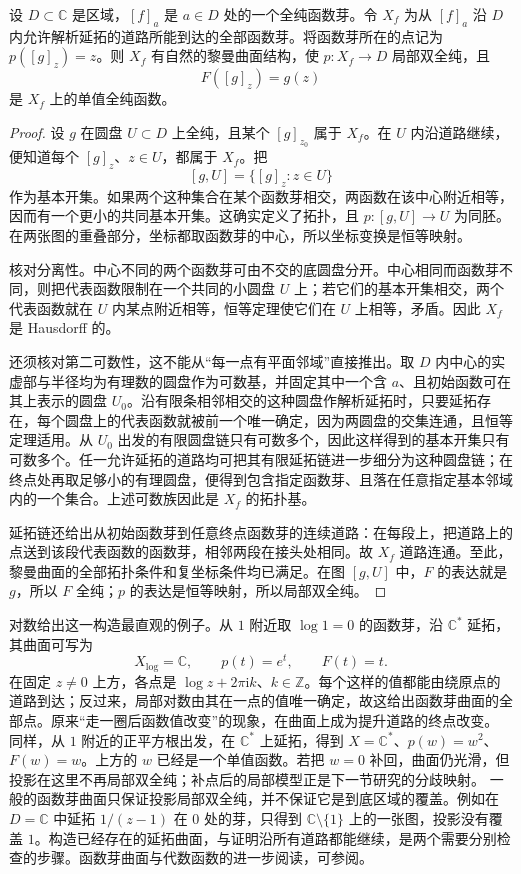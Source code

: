 \begin{theorem}
	\label{g4:thm:0201:continuation-surface}
	设 \(D\subset\mathbb C\) 是区域，\([f]_a\) 是 \(a\in D\) 处的一个全纯函数芽。令 \(X_f\) 为从 \([f]_a\) 沿 \(D\) 内允许解析延拓的道路所能到达的全部函数芽。将函数芽所在的点记为 \(p([g]_z)=z\)。则 \(X_f\) 有自然的黎曼曲面结构，使 \(p:X_f\to D\) 局部双全纯，且
	\[
		F([g]_z)=g(z)
	\]
	是 \(X_f\) 上的单值全纯函数。
\end{theorem}
\begin{proof}
	设 \(g\) 在圆盘 \(U\subset D\) 上全纯，且某个 \([g]_{z_0}\) 属于 \(X_f\)。在 \(U\) 内沿道路继续，便知道每个 \([g]_z\)、\(z\in U\)，都属于 \(X_f\)。把
	\[
		[g,U]=\{[g]_z:z\in U\}
	\]
	作为基本开集。如果两个这种集合在某个函数芽相交，两函数在该中心附近相等，因而有一个更小的共同基本开集。这确实定义了拓扑，且 \(p:[g,U]\to U\) 为同胚。在两张图的重叠部分，坐标都取函数芽的中心，所以坐标变换是恒等映射。

	核对分离性。中心不同的两个函数芽可由不交的底圆盘分开。中心相同而函数芽不同，则把代表函数限制在一个共同的小圆盘 \(U\) 上；若它们的基本开集相交，两个代表函数就在 \(U\) 内某点附近相等，恒等定理使它们在 \(U\) 上相等，矛盾。因此 \(X_f\) 是 Hausdorff 的。

	还须核对第二可数性，这不能从“每一点有平面邻域”直接推出。取 \(D\) 内中心的实虚部与半径均为有理数的圆盘作为可数基，并固定其中一个含 \(a\)、且初始函数可在其上表示的圆盘 \(U_0\)。沿有限条相邻相交的这种圆盘作解析延拓时，只要延拓存在，每个圆盘上的代表函数就被前一个唯一确定，因为两圆盘的交集连通，且恒等定理适用。从 \(U_0\) 出发的有限圆盘链只有可数多个，因此这样得到的基本开集只有可数多个。任一允许延拓的道路均可把其有限延拓链进一步细分为这种圆盘链；在终点处再取足够小的有理圆盘，便得到包含指定函数芽、且落在任意指定基本邻域内的一个集合。上述可数族因此是 \(X_f\) 的拓扑基。

	延拓链还给出从初始函数芽到任意终点函数芽的连续道路：在每段上，把道路上的点送到该段代表函数的函数芽，相邻两段在接头处相同。故 \(X_f\) 道路连通。至此，黎曼曲面的全部拓扑条件和复坐标条件均已满足。在图 \([g,U]\) 中，\(F\) 的表达就是 \(g\)，所以 \(F\) 全纯；\(p\) 的表达是恒等映射，所以局部双全纯。
\end{proof}

对数给出这一构造最直观的例子。从 \(1\) 附近取 \(\log1=0\) 的函数芽，沿 \(\mathbb C^*\) 延拓，其曲面可写为
\[
	X_{\log}=\mathbb C,\qquad p(t)=e^t,\qquad F(t)=t.
\]
在固定 \(z\ne0\) 上方，各点是 \(\log z+2\pi\mathrm{i}k\)、\(k\in\mathbb Z\)。每个这样的值都能由绕原点的道路到达；反过来，局部对数由其在一点的值唯一确定，故这给出函数芽曲面的全部点。原来“走一圈后函数值改变”的现象，在曲面上成为提升道路的终点改变。
\ProseParagraphBreak
同样，从 \(1\) 附近的正平方根出发，在 \(\mathbb C^*\) 上延拓，得到 \(X=\mathbb C^*\)、\(p(w)=w^2\)、\(F(w)=w\)。上方的 \(w\) 已经是一个单值函数。若把 \(w=0\) 补回，曲面仍光滑，但投影在这里不再局部双全纯；补点后的局部模型正是下一节研究的分歧映射。
\ProseParagraphBreak
一般的函数芽曲面只保证投影局部双全纯，并不保证它是到底区域的覆盖。例如在 \(D=\mathbb C\) 中延拓 \(1/(z-1)\) 在 \(0\) 处的芽，只得到 \(\mathbb C\setminus\{1\}\) 上的一张图，投影没有覆盖 \(1\)。构造已经存在的延拓曲面，与证明沿所有道路都能继续，是两个需要分别检查的步骤。函数芽曲面与代数函数的进一步阅读，可参阅\parencite[§§7--8]{Forster1981}。

